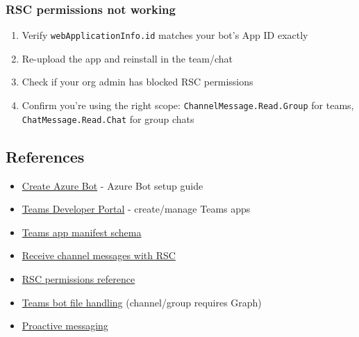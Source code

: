 \subsubsection{RSC permissions not working}


\begin{enumerate}
  \item Verify \texttt{webApplicationInfo.id} matches your bot's App ID exactly
  \item Re-upload the app and reinstall in the team/chat
  \item Check if your org admin has blocked RSC permissions
  \item Confirm you're using the right scope: \texttt{ChannelMessage.Read.Group} for teams, \texttt{ChatMessage.Read.Chat} for group chats
\end{enumerate}


\subsection{References}


\begin{itemize}
  \item \href{https://learn.microsoft.com/en-us/azure/bot-service/bot-service-quickstart-registration}{Create Azure Bot} - Azure Bot setup guide
  \item \href{https://dev.teams.microsoft.com/apps}{Teams Developer Portal} - create/manage Teams apps
  \item \href{https://learn.microsoft.com/en-us/microsoftteams/platform/resources/schema/manifest-schema}{Teams app manifest schema}
  \item \href{https://learn.microsoft.com/en-us/microsoftteams/platform/bots/how-to/conversations/channel-messages-with-rsc}{Receive channel messages with RSC}
  \item \href{https://learn.microsoft.com/en-us/microsoftteams/platform/graph-api/rsc/resource-specific-consent}{RSC permissions reference}
  \item \href{https://learn.microsoft.com/en-us/microsoftteams/platform/bots/how-to/bots-filesv4}{Teams bot file handling} (channel/group requires Graph)
  \item \href{https://learn.microsoft.com/en-us/microsoftteams/platform/bots/how-to/conversations/send-proactive-messages}{Proactive messaging}
\end{itemize}



\clearpage

